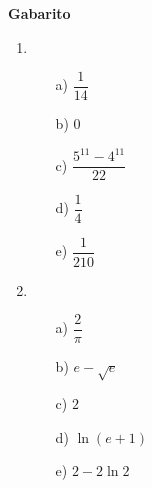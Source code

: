 \documentclass[a4paper,5pt]{amsbook}
\begin{document}
\begin{center}
 \textbf{Gabarito}
\end{center}
\begin{enumerate}
\item 
\begin{itemize}
 \item[a)]$\dfrac{1}{14}$\\
 \item[b)]$0$
 \item[c)]$\dfrac{5^{11}-4^{11}}{22}$
 \item[d)]$\dfrac{1}{4}$\\
 \item[e)]$\dfrac{1}{210}$\\
\end{itemize}
\item 
\begin{itemize}
 \item[a)]$\dfrac{2}{\pi}$
 \item[b)]$e-\sqrt{e}$
 \item[c)]$2$
 \item[d)]$\ln(e+1)$
 \item[e)]$2-2\ln2$
\end{itemize}


\end{enumerate}
\end{document}
